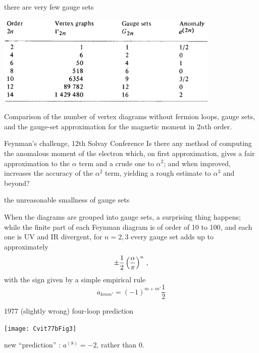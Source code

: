 \begin{frame}{there are very few gauge sets}
\begin{center}
\includegraphics[width=0.80\textwidth]{../../figs/Cvit77bTab1}
\end{center}
{\scriptsize  %
Comparison of the number of vertex diagrams without fermion loops, gauge
sets, and the gauge-set approximation for the magnetic
moment in $2n$th order.
}
\end{frame}

\begin{frame}{Feynman's challenge, 12th Solvay Conference}
Is there any method of computing the anomalous moment of the
electron which, on first approximation, gives a fair approximation to the
$\alpha$ term and a crude one to $\alpha^2$; and when improved, increases
the accuracy of the $\alpha^2$ term, yielding a rough estimate to
$\alpha^3$ and beyond?
\end{frame}

\begin{frame}{the unreasonable smallness of gauge sets}

When the diagrams are grouped into
gauge sets,
a surprising thing happens; while the
finite part of each Feynman diagram is of order of 10 to 100,
and each one is UV and IR divergent, for $n=2,3$
every gauge set adds up to approximately
\[
		   \pm {1 \over 2} \left(\frac{\alpha}{\pi}\right)^n
\,,
\]
with the sign given by a simple empirical rule
\[
a_{kmm'} = (-1)^{m+m'}\frac{1}{2}
\] %
\end{frame}


\begin{frame}{1977 (slightly wrong) four-loop prediction}
\begin{center}
\texttt{[image: Cvit77bFig3]}
\end{center}

{\scriptsize  %
new ``prediction'' : $a^{(8)}=-2$, rather than 0.
}
\end{frame}


